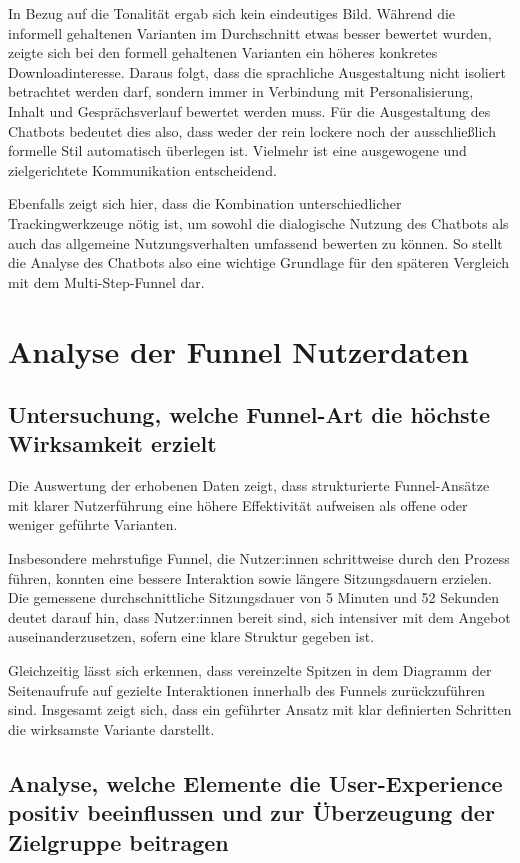 In Bezug auf die Tonalität ergab sich kein eindeutiges Bild. Während die 
informell gehaltenen Varianten im Durchschnitt etwas besser bewertet wurden, 
zeigte sich bei den formell gehaltenen Varianten ein höheres konkretes 
Downloadinteresse. Daraus folgt, dass die sprachliche Ausgestaltung nicht 
isoliert betrachtet werden darf, sondern immer in Verbindung mit 
Personalisierung, Inhalt und Gesprächsverlauf bewertet werden muss. Für die 
Ausgestaltung des Chatbots bedeutet dies also, dass weder der rein lockere noch 
der ausschließlich formelle Stil automatisch überlegen ist. Vielmehr ist eine 
ausgewogene und zielgerichtete Kommunikation entscheidend.

Ebenfalls zeigt sich hier, dass die Kombination unterschiedlicher 
Trackingwerkzeuge nötig ist, um sowohl die dialogische Nutzung des Chatbots als 
auch das allgemeine Nutzungsverhalten umfassend bewerten zu können. So stellt die 
Analyse des Chatbots also eine wichtige Grundlage für den späteren Vergleich mit 
dem Multi-Step-Funnel dar.

\setauthor{\firstauthor}
\section{Analyse der Funnel Nutzerdaten}
\subsection{Untersuchung, welche Funnel-Art die höchste 
Wirksamkeit erzielt}

Die Auswertung der erhobenen Daten zeigt, dass strukturierte 
Funnel-Ansätze mit klarer Nutzerführung eine höhere Effektivität 
aufweisen als offene oder weniger geführte Varianten. 

Insbesondere mehrstufige Funnel, die Nutzer:innen schrittweise 
durch den Prozess führen, konnten eine bessere Interaktion sowie 
längere Sitzungsdauern erzielen. Die gemessene durchschnittliche 
Sitzungsdauer von 5 Minuten und 52 Sekunden deutet darauf hin, 
dass Nutzer:innen bereit sind, sich intensiver mit dem Angebot 
auseinanderzusetzen, sofern eine klare Struktur gegeben ist. 

Gleichzeitig lässt sich erkennen, dass vereinzelte Spitzen in 
dem Diagramm der Seitenaufrufe auf gezielte Interaktionen innerhalb des Funnels 
zurückzuführen sind. Insgesamt zeigt sich, dass ein geführter Ansatz 
mit klar definierten Schritten die wirksamste Variante darstellt.

\subsection{Analyse, welche Elemente die User-Experience positiv 
beeinflussen und zur Überzeugung der Zielgruppe beitragen}

